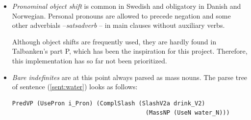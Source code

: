 \documentclass{report}
\begin{document}
\begin{itemize}
\item
\textit{Pronominal object shift} is common in Swedish and obligatory in Danish and Norwegian.
Personal pronouns are allowed to precede negation and some other adverbials --\textit{satsadverb} --
in main clauses without auxiliary verbs.


Although object shifts are frequently used, they are hardly found in
Talbanken's part P, which has been the inspiration for this project.
Therefore, this implementation has so far not been prioritized.\\




\item
\textit{Bare indefinites} are at this point always parsed as mass nouns.
\label{sent:water}
The parse tree of sentence (\ref{sent:water}) looks as follows:
\begin{verbatim}
PredVP (UsePron i_Pron) (ComplSlash (SlashV2a drink_V2) 
                                      (MassNP (UseN water_N))) 
\end{verbatim}


\end{itemize}
\end{document}

